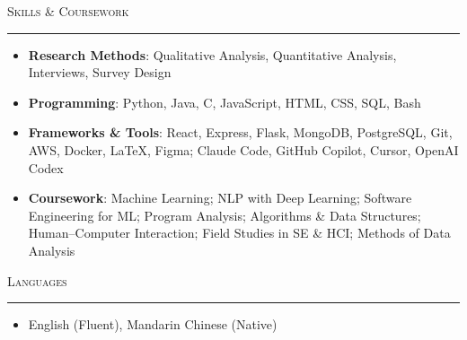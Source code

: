 \documentclass[letterpaper,10pt]{article}
\renewcommand{\section}[1]{%
  \vspace{7pt}%
  {\large\scshape #1}\par\vspace{-5pt}%
  \noindent\rule{\textwidth}{0.4pt}\par\vspace{-3pt}%
}
\newcommand{\resumeItem}[2]{\item\small{\textbf{#1}{: #2}\vspace{-2pt}}}
\newcommand{\plainListStart}{\begin{itemize}[leftmargin=0pt, label={}, labelwidth=0pt, labelsep=0pt, itemsep=0pt, topsep=2pt]}
\newcommand{\plainListEnd}{\end{itemize}}
\begin{document}
\section{Skills \& Coursework}
\plainListStart
  \resumeItem{Research Methods}{Qualitative Analysis, Quantitative Analysis, Interviews, Survey Design}
  \resumeItem{Programming}{Python, Java, C, JavaScript, HTML, CSS, SQL, Bash}
  \resumeItem{Frameworks \& Tools}{React, Express, Flask, MongoDB, PostgreSQL, Git, AWS, Docker, \LaTeX, Figma; Claude Code, GitHub Copilot, Cursor, OpenAI Codex}
  \resumeItem{Coursework}{Machine Learning; NLP with Deep Learning; Software Engineering for ML; Program Analysis; Algorithms \& Data Structures; Human--Computer Interaction; Field Studies in SE \& HCI; Methods of Data Analysis}
\plainListEnd

\section{Languages}
\plainListStart
  \item\small{English (Fluent), Mandarin Chinese (Native)}
\plainListEnd
\end{document}
